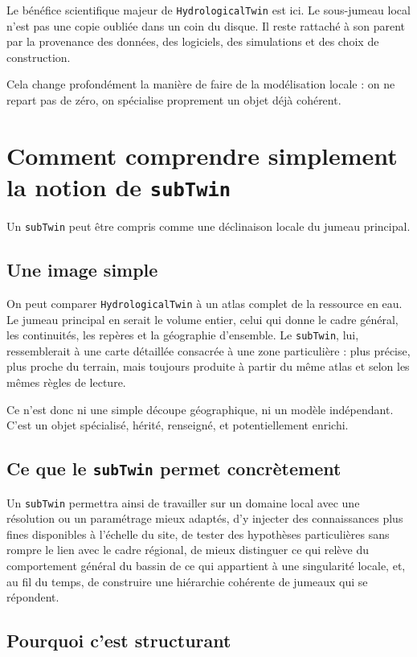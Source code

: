 \documentclass[11pt,a4paper]{article}
\newcommand{\hydrot}{\texttt{HydrologicalTwin}}
\begin{document}
Le bénéfice scientifique majeur de \hydrot{} est ici. Le sous-jumeau local n'est pas une copie oubliée dans un coin du disque. Il reste rattaché à son parent par la provenance des données, des logiciels, des simulations et des choix de construction.

Cela change profondément la manière de faire de la modélisation locale : on ne repart pas de zéro, on spécialise proprement un objet déjà cohérent.

\section{Comment comprendre simplement la notion de \texttt{subTwin}}

Un \texttt{subTwin} peut être compris comme une déclinaison locale du jumeau principal.

\subsection{Une image simple}

On peut comparer \hydrot{} à un atlas complet de la ressource en eau. Le jumeau principal en serait le volume entier, celui qui donne le cadre général, les continuités, les repères et la géographie d'ensemble. Le \texttt{subTwin}, lui, ressemblerait à une carte détaillée consacrée à une zone particulière : plus précise, plus proche du terrain, mais toujours produite à partir du même atlas et selon les mêmes règles de lecture.

Ce n'est donc ni une simple découpe géographique, ni un modèle indépendant. C'est un objet spécialisé, hérité, renseigné, et potentiellement enrichi.

\subsection{Ce que le \texttt{subTwin} permet concrètement}

Un \texttt{subTwin} permettra ainsi de travailler sur un domaine local avec une résolution ou un paramétrage mieux adaptés, d'y injecter des connaissances plus fines disponibles à l'échelle du site, de tester des hypothèses particulières sans rompre le lien avec le cadre régional, de mieux distinguer ce qui relève du comportement général du bassin de ce qui appartient à une singularité locale, et, au fil du temps, de construire une hiérarchie cohérente de jumeaux qui se répondent.

\subsection{Pourquoi c'est structurant}
\end{document}
